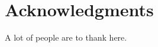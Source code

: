 \documentclass[a4paper,12pt]{article}
\begin{document}












\section*{Acknowledgments}

A lot of people are to thank here.


\newpage



\end{document}
